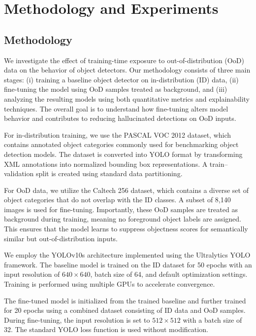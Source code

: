 \section{Methodology and Experiments}
\label{sec:methodology_experiments}

\subsection{Methodology}

We investigate the effect of training-time exposure to out-of-distribution (OoD) data on the behavior of object detectors. Our methodology consists of three main stages: (i) training a baseline object detector on in-distribution (ID) data, (ii) fine-tuning the model using OoD samples treated as background, and (iii) analyzing the resulting models using both quantitative metrics and explainability techniques. The overall goal is to understand how fine-tuning alters model behavior and contributes to reducing hallucinated detections on OoD inputs.

For in-distribution training, we use the PASCAL VOC 2012 dataset, which contains annotated object categories commonly used for benchmarking object detection models. The dataset is converted into YOLO format by transforming XML annotations into normalized bounding box representations. A train–validation split is created using standard data partitioning.

For OoD data, we utilize the Caltech 256 dataset, which contains a diverse set of object categories that do not overlap with the ID classes. A subset of 8,140 images is used for fine-tuning. Importantly, these OoD samples are treated as background during training, meaning no foreground object labels are assigned. This ensures that the model learns to suppress objectness scores for semantically similar but out-of-distribution inputs.

We employ the YOLOv10s architecture implemented using the Ultralytics YOLO framework. The baseline model is trained on the ID dataset for 50 epochs with an input resolution of $640\times640$, batch size of 64, and default optimization settings. Training is performed using multiple GPUs to accelerate convergence.

The fine-tuned model is initialized from the trained baseline and further trained for 20 epochs using a combined dataset consisting of ID data and OoD samples. During fine-tuning, the input resolution is set to $512\times512$ with a batch size of 32. The standard YOLO loss function is used without modification.

